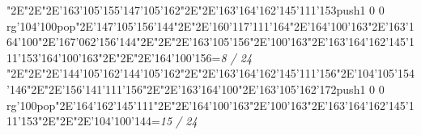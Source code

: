 \null\vfill\enskip\enskip\enskip\ipa\char"2E\enskip\enskip\enskip\ipa\char"2E\enskip\ipa\char"2E\ipa\char'163\ipa\char'105\ipa\char'155\bigskip\ipa\char'147\ipa\char'105\ipa\char'162\ipa\char"2E\enskip\enskip\enskip\ipa\char"2E\ipa\char'163\ipa\char'164\ipa\char'162\ipa\char'145\ipa\char'111\ipa\char'153\bigskip\pdfcolorstack\match push{1 0 0 rg}\ipa\char'104\ipa\char'100\pdfcolorstack\match pop{}\ipa\char"2E\ipa\char'147\ipa\char'105\ipa\char'156\ipa\char'144\ipa\char"2E\enskip\ipa\char"2E\ipa\char'160\ipa\char'117\ipa\char'111\ipa\char'164\ipa\char"2E\ipa\char'164\ipa\char'100\ipa\char'163\ipa\char"2E\ipa\char'163\ipa\char'164\ipa\char'100\ipa\char"2E\ipa\char'167\ipa\char'062\ipa\char'156\ipa\char'144\bigskip\enskip\ipa\char"2E\enskip\enskip\enskip\enskip\ipa\char"2E\enskip\enskip\ipa\char"2E\ipa\char'163\ipa\char'105\ipa\char'156\ipa\char"2E\ipa\char'100\ipa\char'163\ipa\char"2E\ipa\char'163\ipa\char'164\ipa\char'162\ipa\char'145\ipa\char'111\ipa\char'153\bigskip\ipa\char'164\ipa\char'100\ipa\char'163\ipa\char"2E\enskip\enskip\ipa\char"2E\enskip\enskip\enskip\ipa\char"2E\ipa\char'164\ipa\char'100\ipa\char'156\bigskip\vfill\footline={\hfill\tenrm\it 8 / 24}\eject
\null\vfill\enskip\enskip\enskip\ipa\char"2E\enskip\enskip\enskip\ipa\char"2E\enskip\ipa\char"2E\ipa\char'144\ipa\char'105\ipa\char'162\bigskip\ipa\char'144\ipa\char'105\ipa\char'162\ipa\char"2E\enskip\enskip\enskip\ipa\char"2E\ipa\char'163\ipa\char'164\ipa\char'162\ipa\char'145\ipa\char'111\ipa\char'156\bigskip\enskip\enskip\ipa\char"2E\ipa\char'104\ipa\char'105\ipa\char'154\ipa\char'146\ipa\char"2E\enskip\ipa\char"2E\ipa\char'156\ipa\char'141\ipa\char'111\ipa\char'156\ipa\char"2E\enskip\enskip\enskip\ipa\char"2E\ipa\char'163\ipa\char'164\ipa\char'100\ipa\char"2E\ipa\char'163\ipa\char'105\ipa\char'162\ipa\char'172\bigskip\pdfcolorstack\match push{1 0 0 rg}\ipa\char'100\pdfcolorstack\match pop{}\ipa\char"2E\ipa\char'164\ipa\char'162\ipa\char'145\ipa\char'111\ipa\char"2E\enskip\enskip\ipa\char"2E\ipa\char'164\ipa\char'100\ipa\char'163\ipa\char"2E\ipa\char'100\ipa\char'163\ipa\char"2E\ipa\char'163\ipa\char'164\ipa\char'162\ipa\char'145\ipa\char'111\ipa\char'153\bigskip\enskip\enskip\enskip\ipa\char"2E\enskip\enskip\ipa\char"2E\enskip\enskip\enskip\ipa\char"2E\ipa\char'104\ipa\char'100\ipa\char'144\bigskip\vfill\footline={\hfill\tenrm\it 15 / 24}\eject
